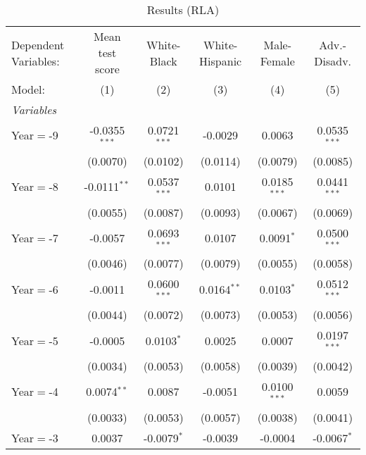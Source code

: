 
\begin{table}[htbp]
   \centering
   \caption{\label{MainResultsRLA} Results (RLA)}
   \begin{tabular}{lccccc}
      \tabularnewline\midrule\midrule
      Dependent Variables: & Mean test score & White-Black     & White-Hispanic & Male-Female     & Adv.-Disadv.\\
      Model:               & (1)             & (2)             & (3)            & (4)             & (5)\\
      \midrule \emph{Variables} &   &   &   &   &  \\
      Year$=$-9            & -0.0355$^{***}$ & 0.0721$^{***}$  & -0.0029        & 0.0063          & 0.0535$^{***}$\\
                           & (0.0070)        & (0.0102)        & (0.0114)       & (0.0079)        & (0.0085)\\
      Year$=$-8            & -0.0111$^{**}$  & 0.0537$^{***}$  & 0.0101         & 0.0185$^{***}$  & 0.0441$^{***}$\\
                           & (0.0055)        & (0.0087)        & (0.0093)       & (0.0067)        & (0.0069)\\
      Year$=$-7            & -0.0057         & 0.0693$^{***}$  & 0.0107         & 0.0091$^{*}$    & 0.0500$^{***}$\\
                           & (0.0046)        & (0.0077)        & (0.0079)       & (0.0055)        & (0.0058)\\
      Year$=$-6            & -0.0011         & 0.0600$^{***}$  & 0.0164$^{**}$  & 0.0103$^{*}$    & 0.0512$^{***}$\\
                           & (0.0044)        & (0.0072)        & (0.0073)       & (0.0053)        & (0.0056)\\
      Year$=$-5            & -0.0005         & 0.0103$^{*}$    & 0.0025         & 0.0007          & 0.0197$^{***}$\\
                           & (0.0034)        & (0.0053)        & (0.0058)       & (0.0039)        & (0.0042)\\
      Year$=$-4            & 0.0074$^{**}$   & 0.0087          & -0.0051        & 0.0100$^{***}$  & 0.0059\\
                           & (0.0033)        & (0.0053)        & (0.0057)       & (0.0038)        & (0.0041)\\
      Year$=$-3            & 0.0037          & -0.0079$^{*}$   & -0.0039        & -0.0004         & -0.0067$^{*}$\\

\end{tabular}
\end{table}
